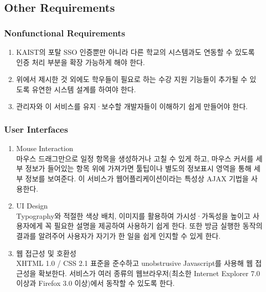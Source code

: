 \documentclass[a4paper,titlepage]{article}
\begin{document}
\subsection{Other Requirements}
\subsubsection{Nonfunctional Requirements}
\begin{enumerate}
	\item KAIST의 포탈 SSO 인증뿐만 아니라 다른 학교의 시스템과도 연동할 수 있도록 인증 처리 부분을 확장 가능하게 해야 한다.
	\item 위에서 제시한 것 외에도 학우들이 필요로 하는 수강 지원 기능들이 추가될 수 있도록 유연한 시스템 설계를 하여야 한다.
	\item 관리자와 이 서비스를 유지·보수할 개발자들이 이해하기 쉽게 만들어야 한다.
\end{enumerate}
\subsubsection{User Interfaces}
\begin{enumerate}
	\item Mouse Interaction\\
	마우스 드래그만으로 일정 항목을 생성하거나 고칠 수 있게 하고, 마우스 커서를 세부 정보가 들어있는 항목 위에 가져가면 툴팁이나 별도의 정보표시 영역을 통해 세부 정보를 보여준다.
	이 서비스가 웹어플리케이션이라는 특성상 AJAX 기법을 사용한다. 
	\item UI Design\\
	Typography와 적절한 색상 배치, 이미지를 활용하여 가시성·가독성을 높이고 사용자에게 꼭 필요한 설명을 제공하여 사용하기 쉽게 한다.
	또한 방금 실행한 동작의 결과를 알려주어 사용자가 자기가 한 일을 쉽게 인지할 수 있게 한다.
	\item 웹 접근성 및 호환성\\
	XHTML 1.0 / CSS 2.1 표준을 준수하고 unobstrusive Javascript를 사용해 웹 접근성을 확보한다.
	서비스가 여러 종류의 웹브라우저(최소한 Internet Explorer 7.0 이상과 Firefox 3.0 이상)에서 동작할 수 있도록 한다. 
\end{enumerate}
\end{document}
